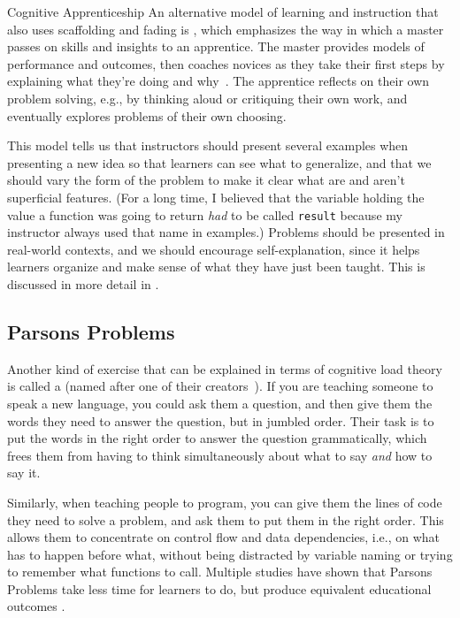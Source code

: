 \begin{aside}{Cognitive Apprenticeship}
  An alternative model of learning and instruction that also uses
  scaffolding and fading is
  ,
  which emphasizes the way in which a master passes on skills and
  insights to an apprentice. The master provides models of performance
  and outcomes, then coaches novices as they take their first steps by
  explaining what they're doing and why~\cite{Coll1991,Casp2007}. The
  apprentice reflects on their own problem solving, e.g., by thinking
  aloud or critiquing their own work, and eventually explores problems
  of their own choosing.

  This model tells us that instructors should present several examples
  when presenting a new idea so that learners can see what to
  generalize, and that we should vary the form of the problem to make it
  clear what are and aren't superficial features. (For a long time, I
  believed that the variable holding the value a function was going to
  return \emph{had} to be called \texttt{result} because my instructor always used
  that name in examples.) Problems should be presented in real-world
  contexts, and we should encourage self-explanation, since it helps
  learners organize and make sense of what they have just been taught.
  This is discussed in more detail in
  .
\end{aside}

\subsection*{Parsons Problems}

Another kind of exercise that can be explained in terms of cognitive
load theory is called a 
(named after one of their creators~\cite{Pars2006}). If you are
teaching someone to speak a new language, you could ask them a question,
and then give them the words they need to answer the question, but in
jumbled order. Their task is to put the words in the right order to
answer the question grammatically, which frees them from having to think
simultaneously about what to say \emph{and} how to say it.

Similarly, when teaching people to program, you can give them the lines
of code they need to solve a problem, and ask them to put them in the
right order. This allows them to concentrate on control flow and data
dependencies, i.e., on what has to happen before what, without being
distracted by variable naming or trying to remember what functions to
call. Multiple studies have shown that Parsons Problems take less time
for learners to do, but produce equivalent educational outcomes
\cite{Eric2017}.

